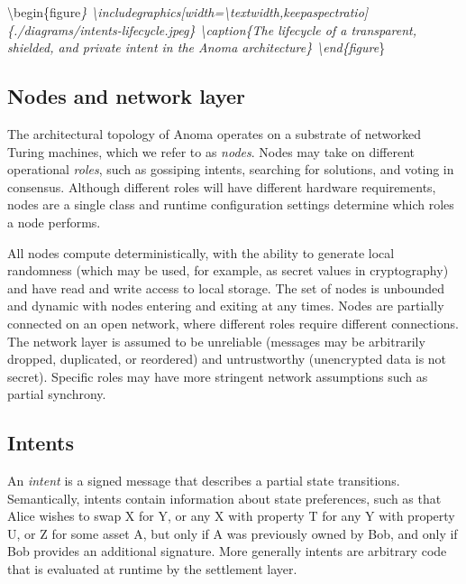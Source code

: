 \textbackslash begin\{figure\emph{\}
\textbackslash includegraphics{[}width=\textbackslash textwidth,keepaspectratio{]}\{./diagrams/intents-lifecycle.jpeg\}
\textbackslash caption\{The lifecycle of a transparent, shielded, and
private intent in the Anoma architecture\} \textbackslash end\{figure}\}

\subsection{Nodes and network layer}\label{nodes-and-network-layer}

The architectural topology of Anoma operates on a substrate of networked
Turing machines, which we refer to as \emph{nodes}. Nodes may take on
different operational \emph{roles}, such as gossiping intents, searching
for solutions, and voting in consensus. Although different roles will
have different hardware requirements, nodes are a single class and
runtime configuration settings determine which roles a node performs.

All nodes compute deterministically, with the ability to generate local
randomness (which may be used, for example, as secret values in
cryptography) and have read and write access to local storage. The set
of nodes is unbounded and dynamic with nodes entering and exiting at any
times. Nodes are partially connected on an open network, where different
roles require different connections. The network layer is assumed to be
unreliable (messages may be arbitrarily dropped, duplicated, or
reordered) and untrustworthy (unencrypted data is not secret). Specific
roles may have more stringent network assumptions such as partial
synchrony.

\subsection{Intents}\label{intents}

An \emph{intent} is a signed message that describes a partial state
transitions. Semantically, intents contain information about state
preferences, such as that Alice wishes to swap X for Y, or any X with
property T for any Y with property U, or Z for some asset A, but only if
A was previously owned by Bob, and only if Bob provides an additional
signature. More generally intents are arbitrary code that is evaluated
at runtime by the settlement layer.


